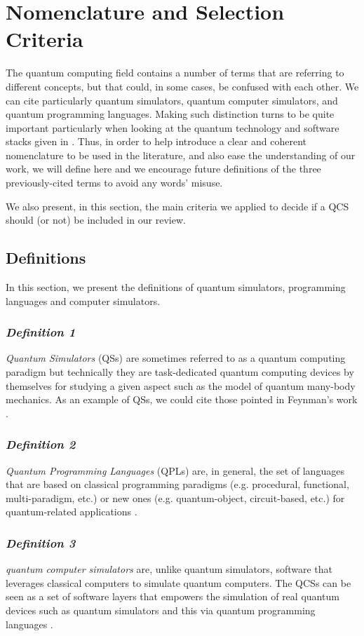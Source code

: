 \documentclass[conference]{IEEEtran}
\begin{document}
\section{Nomenclature and Selection Criteria \label{sec:ND}}
The quantum computing field contains a number of terms that are referring to different concepts, but that could, in some cases, be confused with each other. We can cite particularly quantum simulators, quantum computer simulators, and quantum programming languages. Making such distinction turns to be quite important particularly when looking at the quantum technology and software stacks given in \cite{ref_8}. Thus, in order to help introduce a clear and coherent nomenclature to be used in the literature, and also ease the understanding of our work, we will define here and we encourage future definitions of the three previously-cited terms to avoid any words' misuse.  

We also present, in this section, the main criteria we applied to decide if a QCS should (or not) be included in our review.

\subsection{Definitions}
In this section, we present the definitions of quantum simulators, programming languages and computer simulators. 

\subsubsection*{\textit{Definition 1}} \emph{Quantum Simulators} (QSs) are sometimes referred to as a quantum computing paradigm but technically they are task-dedicated quantum computing devices by themselves for studying a given aspect such as the model of quantum many-body mechanics. As an example of QSs, we could cite those pointed in Feynman's work \cite{ref_1}.  

\subsubsection*{\textit{Definition 2}} \emph{Quantum Programming Languages} (QPLs) are, in general, the set of languages that are based on classical programming paradigms (e.g. procedural, functional, multi-paradigm, etc.) or new ones (e.g. quantum-object, circuit-based, etc.) for quantum-related applications \cite{ref_3}. 

\subsubsection*{\textit{Definition 3}} \emph{quantum computer simulators} are, unlike quantum simulators, software that leverages classical computers to simulate quantum computers. The QCSs can be seen as a set of software layers that empowers the simulation of real quantum devices such as quantum simulators and this via quantum programming languages \cite{ref_1}. 
\end{document}
